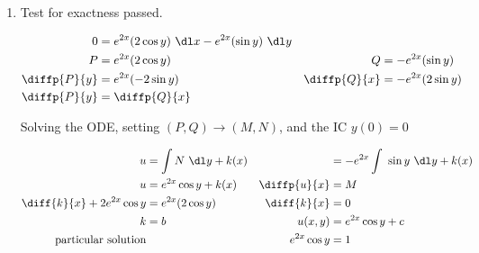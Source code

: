 \begin{enumerate}
    \item Test for exactness passed.

          \begin{align}
              0            & = e^{2x} (2 \cos y)\ \dl x - e^{2x} ( \sin y) \ \dl y   \\
              P            & = e^{2x} (2 \cos y)                                   &
              Q            & = -e^{2x} (\sin y)                                      \\
              \diffp{P}{y} & = e^{2x} (-2 \sin y)                                  &
              \diffp{Q}{x} & = -e^{2x} (2 \sin y)                                    \\
              \diffp{P}{y} & = \diffp{Q}{x}
          \end{align}

          Solving the ODE, setting $ (P, Q) \to (M, N) $, and the IC $ y(0) = 0 $

          \begin{align}
              u                            & = \int N\ \dl y+ k(x)               &
                                           & = -e^{2x} \int\ \sin y\ \dl y+ k(x)   \\
              u                            & = e^{2x} \cos y + k(x)              &
              \diffp{u}{x}                 & = M                                   \\
              \diff{k}{x} + 2e^{2x} \cos y & =  e^{2x} (2\cos y)                 &
              \diff{k}{x}                  & = 0                                   \\
              k                            & = b                                 &
              u(x, y)                      & = e^{2x} \cos y  + c                  \\
              \text{particular solution}   &                                     &
              e^{2x} \cos y                & = 1
          \end{align}



\end{enumerate}
